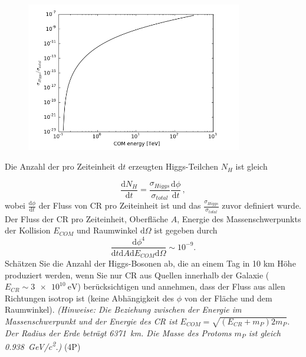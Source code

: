 \begin{enumerate}
\begin{figure}[htbp]
		            \centering
		            \includegraphics[height=6.5cm]{figures/Higgs_BR}
\end{figure}
Die Anzahl der pro Zeiteinheit $\mathrm{d}t$ erzeugten Higgs-Teilchen $N_H$ ist gleich

\begin{equation}
\frac{\mathrm{d}N_H}{\mathrm{d}t}=\frac{\sigma_{Higgs}}{\sigma_{total}}\frac{\mathrm{d}\phi}{\mathrm{d}t}\,,
\end{equation}
wobei $\frac{\mathrm{d}\phi}{\mathrm{d}t}$ der Fluss von CR pro Zeiteinheit ist und das $\frac{\sigma_{Higgs}}{\sigma_{total}}$ zuvor definiert wurde.
Der Fluss der CR pro Zeiteinheit, Oberfläche $A$, Energie des Massenschwerpunkts der Kollision $E_{COM}$ und Raumwinkel $\mathrm{d}\Omega$ ist gegeben durch
\begin{equation}
\frac{\mathrm{d}\phi^4}{\mathrm{d}t\mathrm{d}A\mathrm{d}E_{COM}\mathrm{d}\Omega}\sim 10^{-9}.
\end{equation}
Schätzen Sie die Anzahl der Higgs-Bosonen ab, die an einem Tag in 10 km Höhe produziert werden, wenn Sie nur CR aus Quellen innerhalb der Galaxie ($E_{CR}\sim \SI{3e10}{\electronvolt}$) berücksichtigen und annehmen, dass der Fluss aus allen Richtungen isotrop ist (keine Abhängigkeit des $\phi$ von der Fläche und dem Raumwinkel).
\textit{(Hinweise: Die Beziehung zwischen der Energie im Massenschwerpunkt und der Energie des CR ist $E_{COM}=\sqrt{(E_{CR} +m_P)2m_P}$. Der Radius der Erde beträgt \SI{6371}{\kilo\meter}. Die Masse des Protoms $m_P$ ist gleich \SI{0.938}{\giga\electronvolt/c^2}.)} (4P)
\end{enumerate}